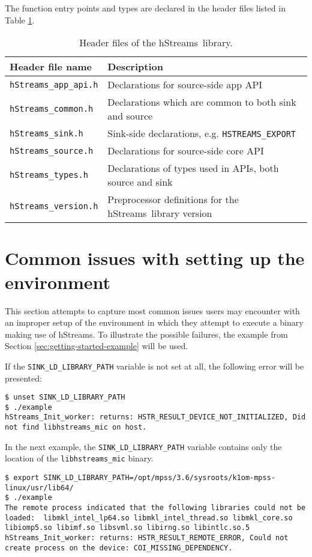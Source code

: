 \documentclass[a4,oneside]{book}
\newcommand{\hstreams}{hStreams}
\begin{document}
The function entry points and types are declared in the header files listed in Table \ref{tab:hstreams-headers}.
\begin{table}[h]
\begin{tabularx}{\textwidth}{ l X }\hline
  Header file name & Description \\ \hline
  \texttt{hStreams\_app\_api.h} & Declarations for source-side app API \\ \hline
  \texttt{hStreams\_common.h} & Declarations which are common to both sink and source \\ \hline
  \texttt{hStreams\_sink.h} & Sink-side declarations, e.g. \texttt{HSTREAMS\_EXPORT} \\ \hline
  \texttt{hStreams\_source.h} & Declarations for source-side core API \\ \hline
  \texttt{hStreams\_types.h} & Declarations of types used in APIs, both source and sink \\ \hline
  \texttt{hStreams\_version.h} & Preprocessor definitions for the \hstreams\ library version \\ \hline
\end{tabularx}
\caption{Header files of the \hstreams\ library.}
\label{tab:hstreams-headers}
\end{table}

\section{Common issues with setting up the environment}
This section attempts to capture most common issues users may encounter with an improper setup of the environment in which they attempt to execute a binary making use of \hstreams.
To illustrate the possible failures, the example from Section \ref{sec:getting-started-example} will be used.

If the \texttt{SINK\_LD\_LIBRARY\_PATH} variable is not set at all, the following error will be presented:
\begin{lstlisting}[style=BashCmdListingStyle,caption={Running the example without \texttt{SINK\_LD\_LIBRARY\_PATH}},frame=tlrb,label={lst:example-nosinkld}]
$ unset SINK_LD_LIBRARY_PATH
$ ./example
hStreams_Init_worker: returns: HSTR_RESULT_DEVICE_NOT_INITIALIZED, Did not find libhstreams_mic on host.
\end{lstlisting}

In the next example, the \texttt{SINK\_LD\_LIBRARY\_PATH} variable contains only the location of the \texttt{libhstreams\_mic} binary.
\begin{lstlisting}[style=BashCmdListingStyle,caption={Running the example with incomplete \texttt{SINK\_LD\_LIBRARY\_PATH}},frame=tlrb,label={lst:example-incompletesinkld0}]
$ export SINK_LD_LIBRARY_PATH=/opt/mpss/3.6/sysroots/k1om-mpss-linux/usr/lib64/
$ ./example
The remote process indicated that the following libraries could not be loaded:  libmkl_intel_lp64.so libmkl_intel_thread.so libmkl_core.so libiomp5.so libimf.so libsvml.so libirng.so libintlc.so.5
hStreams_Init_worker: returns: HSTR_RESULT_REMOTE_ERROR, Could not create process on the device: COI_MISSING_DEPENDENCY.
\end{lstlisting}
\end{document}
